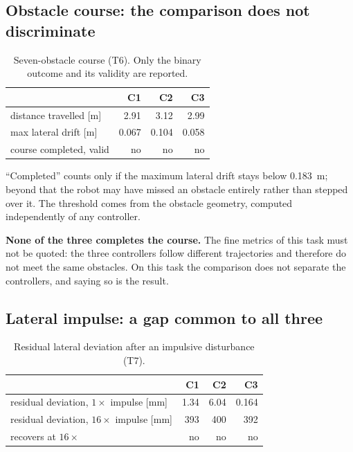 \documentclass[11pt,a4paper]{article}
\newcommand{\Co}{\textsf{C1}}
\newcommand{\Ct}{\textsf{C2}}
\newcommand{\Cth}{\textsf{C3}}
\begin{document}
\subsection{Obstacle course: the comparison does not discriminate}

\begin{table}[htbp]
\centering
\caption{Seven-obstacle course (T6). Only the binary outcome and its validity
are reported.}
\label{tab:t6}
\small
\begin{tabular}{@{}lrrr@{}}
\toprule
 & \Co & \Ct & \Cth \\
\midrule
distance travelled [m]      & 2.91  & 3.12  & 2.99 \\
max lateral drift [m]       & 0.067 & 0.104 & 0.058 \\
course completed, valid     & no    & no    & no \\
\bottomrule
\end{tabular}
\end{table}

``Completed'' counts only if the maximum lateral drift stays below
\SI{0.183}{\meter}; beyond that the robot may have missed an obstacle entirely
rather than stepped over it. The threshold comes from the obstacle geometry,
computed independently of any controller.

\textbf{None of the three completes the course.} The fine metrics of this task
must not be quoted: the three controllers follow different trajectories and
therefore do not meet the same obstacles. On this task the comparison does not
separate the controllers, and saying so is the result.

\subsection{Lateral impulse: a gap common to all three}

\begin{table}[htbp]
\centering
\caption{Residual lateral deviation after an impulsive disturbance (T7).}
\label{tab:t7}
\small
\begin{tabular}{@{}lrrr@{}}
\toprule
 & \Co & \Ct & \Cth \\
\midrule
residual deviation, $1\times$ impulse [mm]  & 1.34 & 6.04 & 0.164 \\
residual deviation, $16\times$ impulse [mm] & 393  & 400  & 392 \\
recovers at $16\times$                      & no   & no   & no \\
\bottomrule
\end{tabular}
\end{table}
\end{document}
